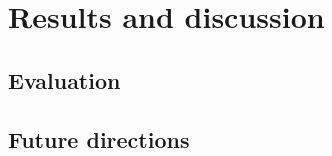 \section{Results and discussion}\label{sec:discussion}

\subsection{Evaluation}

\subsection{Future directions}


